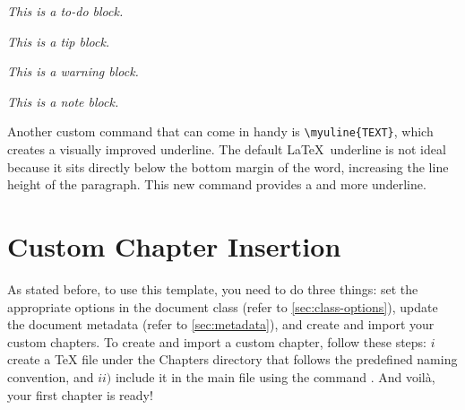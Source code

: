 {\vspace{.875em}
\begin{tcbraster}[
    raster columns=2, 
    raster equal height, 
    nobeforeafter, 
    raster column skip=2cm
]
\begin{block}[todo]
    \textit{This is a to-do block.}
\end{block}
\begin{block}[tip]
    \textit{This is a tip block.}
\end{block}
\end{tcbraster}

\begin{tcbraster}[
    raster columns=2, 
    raster equal height, 
    nobeforeafter, 
    raster column skip=2cm
]
\begin{block}[warning]
    \textit{This is a warning block.}
\end{block}
\begin{block}[note]
    \textit{This is a note block.}
\end{block}
\end{tcbraster}
\vspace{.875em}

Another custom command that can come in handy is \verb|\myuline{TEXT}|, which creates a visually improved underline. The default \LaTeX~underline is not ideal because it sits directly below the bottom margin of the word, increasing the line height of the paragraph. This new command provides a  and more  underline.

\section{Custom Chapter Insertion}
As stated before, to use this template, you need to do three things: set the appropriate options in the document class (refer to \autoref{sec:class-options}), update the document metadata (refer to \autoref{sec:metadata}), and create and import your custom chapters. To create and import a custom chapter, follow these steps: \(i\) create a TeX file under the Chapters directory that follows the predefined naming convention, and \(ii)\) include it in the main file using the command \verb||. And voilà, your first chapter is ready!
}